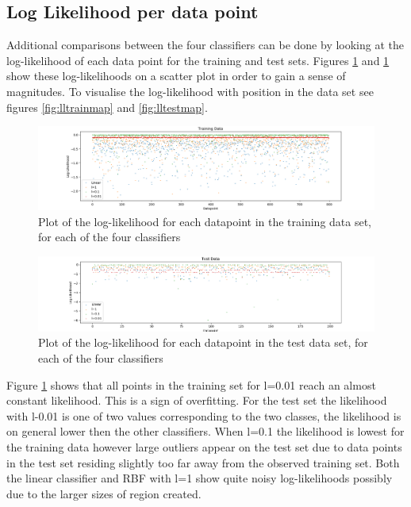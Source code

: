 \documentclass[twoside,twocolumn]{article}
\begin{document}
\subsection{Log Likelihood per data point}
Additional comparisons between the four classifiers can be done by looking at the log-likelihood of each data point for the training and test sets. Figures \ref{fig:lltrain} and \ref{fig:lltrain} show these log-likelihoods on a scatter plot in order to gain a sense of magnitudes. To visualise the  log-likelihood with position in the data set see figures \ref{fig:lltrainmap} and \ref{fig:lltestmap}.
\begin{figure}[h]
  \centering
    \includegraphics[width=\linewidth]{trainingdatall2}
  \caption{Plot of the log-likelihood for each datapoint in the training data set, for each of the four classifiers}
  \label{fig:lltrain}
\end{figure}
\begin{figure}[h]
  \centering
    \includegraphics[width=\linewidth]{testdatall2}
  \caption{Plot of the log-likelihood for each datapoint in the test data set, for each of the four classifiers}
  \label{fig:lltest}
\end{figure}

Figure \ref{fig:lltrain} shows that all points in the training set for l=0.01 reach an almost constant likelihood. This is a sign of overfitting. For the test set the likelihood with l-0.01 is one of two values corresponding to the two classes, the likelihood is on general lower then the other classifiers. When l=0.1 the likelihood is lowest for the training data however large outliers appear on the test set due to data points in the test set residing slightly too far away from the observed training set. Both the linear classifier and RBF with l=1 show quite noisy log-likelihoods   possibly due to the larger sizes of region created.
\end{document}
